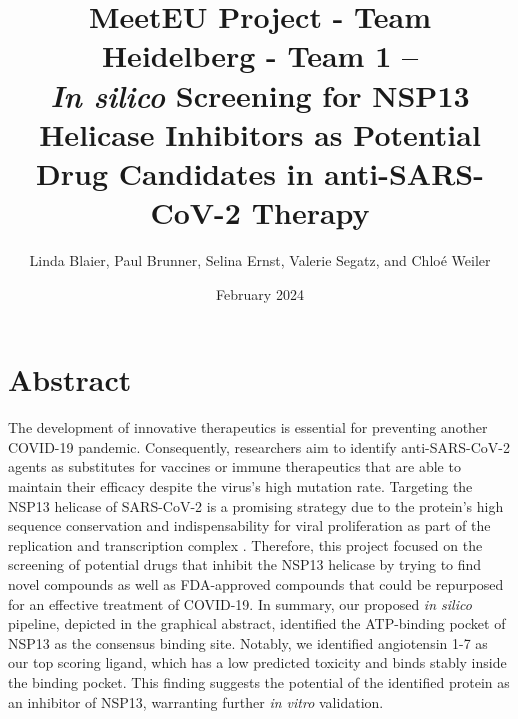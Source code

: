 \documentclass[11pt, letterpaper, titlepage]{article}
\title{MeetEU Project - Team Heidelberg - Team 1 -- \\ \textit{In silico} Screening for NSP13 Helicase Inhibitors as Potential Drug Candidates in anti-SARS-CoV-2 Therapy}
\author{Linda Blaier, Paul Brunner, Selina Ernst, Valerie Segatz, and Chlo\'{e} Weiler}
\date{February 2024}
\renewcommand{\cite}{\parencite}
\begin{document}
\maketitle

\ihead{\headmark}
\cfoot{\pagemark}   %



\section{Abstract}

The development of innovative therapeutics is essential for preventing another COVID-19 pandemic. Consequently, researchers aim to identify anti-SARS-CoV-2 agents as substitutes for vaccines or immune therapeutics that are able to maintain their efficacy despite the virus's high mutation rate. Targeting the NSP13 helicase of SARS-CoV-2 is a promising strategy due to the protein's high sequence conservation and indispensability for viral proliferation as part of the replication and transcription complex \cite{Marecki,Malone_2022}. Therefore, this project focused on the screening of potential drugs that inhibit the NSP13 helicase by trying to find novel compounds as well as FDA-approved compounds that could be repurposed for an effective treatment of COVID-19. In summary, our proposed \textit{in silico} pipeline, depicted in the graphical abstract, identified the ATP-binding pocket of NSP13 as the consensus binding site. Notably, we identified angiotensin 1-7 as our top scoring ligand, which has a low predicted toxicity and binds stably inside the binding pocket. This finding suggests the potential of the identified protein as an inhibitor of NSP13, warranting further \textit{in vitro} validation.
\FloatBarrier
\end{document}
